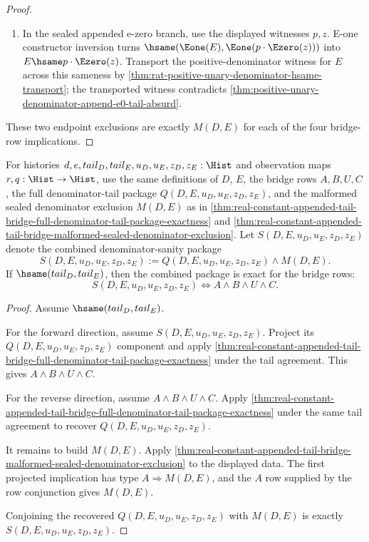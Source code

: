 \begin{proof}
\begin{enumerate}
  \item In the sealed appended e-zero branch, use the displayed witnesses
  $p,z$. E-one constructor inversion turns
  $\hsame(\Eone(E),\Eone(p\cdot\Ezero(z)))$ into
  $E\hsame p\cdot\Ezero(z)$. Transport the positive-denominator witness for
  $E$ across this sameness by
  \autoref{thm:rat-positive-unary-denominator-hsame-transport}; the
  transported witness contradicts
  \autoref{thm:positive-unary-denominator-append-e0-tail-absurd}.
\end{enumerate}

These two endpoint exclusions are exactly $M(D,E)$ for each of the four
bridge-row implications.
\end{proof}

\begin{theorem}
\label{thm:real-constant-appended-tail-bridge-full-denominator-sanity-exactness}
For histories $d,e,tail_D,tail_E,u_D,u_E,z_D,z_E:\Hist$ and observation maps
$r,q:\Hist\to\Hist$, use the same definitions of $D$, $E$, the bridge rows
$A,B,U,C$, the full denominator-tail package $Q(D,E,u_D,u_E,z_D,z_E)$, and
the malformed sealed denominator exclusion $M(D,E)$ as in
\autoref{thm:real-constant-appended-tail-bridge-full-denominator-tail-package-exactness}
and
\autoref{thm:real-constant-appended-tail-bridge-malformed-sealed-denominator-exclusion}.
Let $S(D,E,u_D,u_E,z_D,z_E)$ denote the combined denominator-sanity package
$$
S(D,E,u_D,u_E,z_D,z_E)\mathrel{:=}Q(D,E,u_D,u_E,z_D,z_E)\land M(D,E).
$$
If $\hsame(tail_D,tail_E)$, then the combined package is exact for the bridge
rows:
$$
S(D,E,u_D,u_E,z_D,z_E)\Longleftrightarrow A\land B\land U\land C.
$$
\end{theorem}
\begin{proof}
Assume $\hsame(tail_D,tail_E)$.

For the forward direction, assume $S(D,E,u_D,u_E,z_D,z_E)$. Project its
$Q(D,E,u_D,u_E,z_D,z_E)$ component and apply
\autoref{thm:real-constant-appended-tail-bridge-full-denominator-tail-package-exactness}
under the tail agreement. This gives $A\land B\land U\land C$.

For the reverse direction, assume $A\land B\land U\land C$. Apply
\autoref{thm:real-constant-appended-tail-bridge-full-denominator-tail-package-exactness}
under the same tail agreement to recover
$Q(D,E,u_D,u_E,z_D,z_E)$.

It remains to build $M(D,E)$. Apply
\autoref{thm:real-constant-appended-tail-bridge-malformed-sealed-denominator-exclusion}
to the displayed data. The first projected implication has type
$A\Longrightarrow M(D,E)$, and the $A$ row supplied by the row conjunction gives
$M(D,E)$.

Conjoining the recovered $Q(D,E,u_D,u_E,z_D,z_E)$ with $M(D,E)$ is exactly
$S(D,E,u_D,u_E,z_D,z_E)$.
\end{proof}

